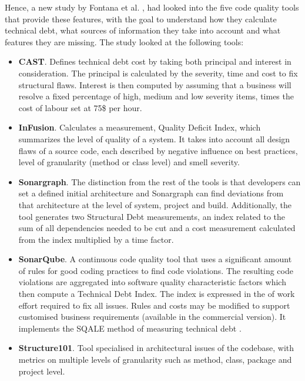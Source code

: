 \documentclass{mprop}
\begin{document}
Hence, a new study by Fontana et al. \cite{Fontana2016}, had looked into the
five code quality tools that provide these features, with the goal to understand
how they calculate technical debt, what sources of information they take into
account and what features they are missing. The study looked at the following
tools:
\begin{itemize}
	\item \textbf{CAST}. Defines technical debt cost by taking both principal
	      and interest in consideration. The principal is calculated by the
	      severity, time and cost to fix structural flaws. Interest is then computed
	      by assuming that a business will resolve a fixed percentage of high, medium
	      and low severity items, times the cost of labour set at 75\$ per hour.
	\item \textbf{InFusion}. Calculates a measurement, Quality Deficit Index,
	      which summarizes the level of quality of a system. It takes into account all
	      design flaws of a source code, each described by negative influence on best
	      practices, level of granularity (method or class level) and smell severity.
	\item \textbf{Sonargraph}. The distinction from the rest of the tools is
	      that developers can set a defined initial architecture and Sonargraph can
	      find deviations from that architecture at the level of system, project and
	      build. Additionally, the tool generates two Structural Debt measurements, an
	      index related to the sum of all dependencies needed to be cut and a cost
	      measurement calculated from the index multiplied by a time factor.
	\item \textbf{SonarQube}. A continuous code quality tool that uses a
	      significant amount of rules for good coding practices to find code
	      violations. The resulting code violations are aggregated into software
	      quality characteristic factors which then compute a Technical Debt
	      Index. The index is expressed in the of work effort required to fix
	      all issues. Rules and costs may be modified to support customised
	      business requirements (available in the commercial version). It
	      implements the SQALE method of measuring technical debt
	      \cite{Letouzey2012}.
	\item \textbf{Structure101}. Tool specialised in architectural issues of the
	      codebase, with metrics on multiple levels of granularity such as method,
	      class, package and project level.
\end{itemize}
\end{document}
